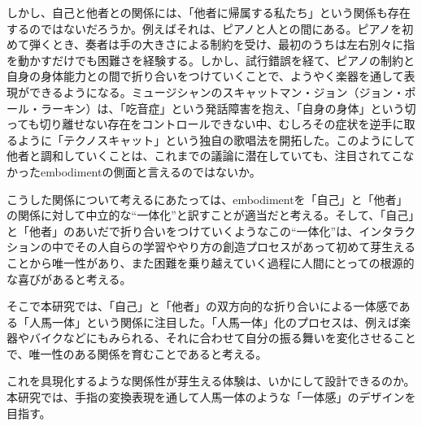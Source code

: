 
しかし、自己と他者との関係には、「他者に帰属する私たち」という関係も存在するのではないだろうか。例えばそれは、ピアノと人との間にある。ピアノを初めて弾くとき、奏者は手の大きさによる制約を受け、最初のうちは左右別々に指を動かすだけでも困難さを経験する。しかし、試行錯誤を経て、ピアノの制約と自身の身体能力との間で折り合いをつけていくことで、ようやく楽器を通して表現ができるようになる。ミュージシャンのスキャットマン・ジョン（ジョン・ポール・ラーキン）は、「吃音症」という発話障害を抱え、「自身の身体」という切っても切り離せない存在をコントロールできない中、むしろその症状を逆手に取るように「テクノスキャット」という独自の歌唱法を開拓した。このようにして他者と調和していくことは、これまでの議論に潜在していても、注目されてこなかったembodimentの側面と言えるのではないか。

こうした関係について考えるにあたっては、embodimentを「自己」と「他者」の関係に対して中立的な``一体化''と訳すことが適当だと考える。そして、「自己」と「他者」のあいだで折り合いをつけていくようなこの``一体化''は、インタラクションの中でその人自らの学習ややり方の創造プロセスがあって初めて芽生えることから唯一性があり、また困難を乗り越えていく過程に人間にとっての根源的な喜びがあると考える。

そこで本研究では、「自己」と「他者」の双方向的な折り合いによる一体感である「人馬一体」という関係に注目した。「人馬一体」化のプロセスは、例えば楽器やバイクなどにもみられる、それに合わせて自分の振る舞いを変化させることで、唯一性のある関係を育むことであると考える。

これを具現化するような関係性が芽生える体験は、いかにして設計できるのか。本研究では、手指の変換表現を通して人馬一体のような「一体感」のデザインを目指す。




